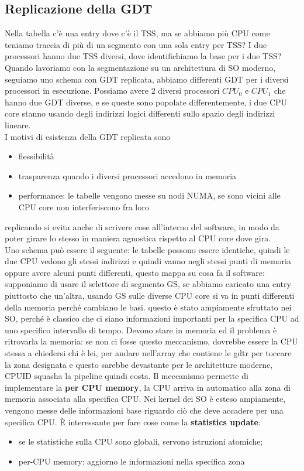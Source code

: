 \documentclass[12pt, oneside]{extbook}
\begin{document}
\subsection{Replicazione della GDT}
Nella tabella c'è una entry dove c'è il TSS, ma se abbiamo più CPU come teniamo traccia di più di un segmento con una sola entry per TSS? I due processori hanno due TSS diversi, dove identifichiamo la base per i due TSS? Quando lavoriamo con la segmentazione su un architettura di SO moderno, seguiamo uno schema con GDT replicata, abbiamo differenti GDT per i diversi processori in esecuzione. Possiamo avere 2 diversi processori $CPU_0$ e $CPU_1$ che hanno due GDT diverse, e se queste sono popolate differentemente, i due CPU core stanno usando degli indirizzi logici differenti sullo spazio degli indirizzi lineare.\\ I motivi di esistenza della GDT replicata sono
\begin{itemize}
\item flessibilità
\item trasparenza quando i diversi processori accedono in memoria
\item performance: le tabelle vengono messe su nodi NUMA, se sono vicini alle CPU core non interferiscono fra loro
\end{itemize}
replicando si evita anche di scrivere cose all'interno del software, in modo da poter girare lo stesso in maniera agnostica rispetto al CPU core dove gira.\\ Uno schema può essere il seguente:
le tabelle possono essere identiche, quindi le due CPU vedono gli stessi indirizzi e quindi vanno negli stessi punti di memoria oppure avere alcuni punti differenti, questo mappa su cosa fa il software: supponiamo di usare il selettore di segmento GS, se abbiamo caricato una entry piuttosto che un'altra, usando GS sulle diverse CPU core si va in punti differenti della memoria perché cambiano le basi.
questo è stato ampiamente sfruttato nei SO, perché è classico che ci siano informazioni importanti per la specifica CPU ad uno specifico intervallo di tempo. Devono stare in memoria ed il problema è ritrovarla la memoria: se non ci fosse questo meccanismo, dovrebbe essere la CPU stessa a chiedersi chi è lei, per andare nell'array che contiene le gdtr per toccare la zona designata e questo sarebbe devastante per le architetture moderne, CPUID squasha la pipeline quindi costa. Il meccanismo permette di implementare la \textbf{per CPU memory}, la CPU arriva in automatico alla zona di memoria associata alla specifica CPU. Nei kernel dei SO è esteso ampiamente, vengono messe delle informazioni base riguardo ciò che deve accadere per una specifica CPU. È interessante per fare cose come la \textbf{statistics update}:
\begin{itemize}
\item se le statistiche sulla CPU sono globali, servono istruzioni atomiche;
\item per-CPU memory: aggiorno le informazioni nella specifica zona
\end{itemize}
\end{document}
